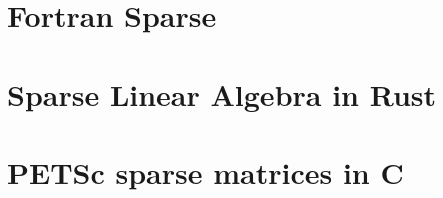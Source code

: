 \section{Fortran Sparse}

\section{Sparse Linear Algebra in Rust}


\section{PETSc sparse matrices in C}
